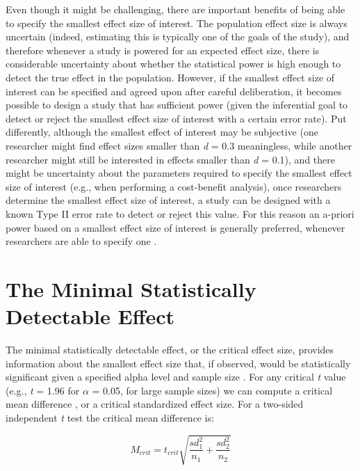 \documentclass[
  oneside]{krantz}
\begin{document}
Even though it might be challenging, there are important benefits of being able to specify the smallest effect size of interest. The population effect size is always uncertain (indeed, estimating this is typically one of the goals of the study), and therefore whenever a study is powered for an expected effect size, there is considerable uncertainty about whether the statistical power is high enough to detect the true effect in the population. However, if the smallest effect size of interest can be specified and agreed upon after careful deliberation, it becomes possible to design a study that has sufficient power (given the inferential goal to detect or reject the smallest effect size of interest with a certain error rate). Put differently, although the smallest effect of interest may be subjective (one researcher might find effect sizes smaller than \emph{d} = 0.3 meaningless, while another researcher might still be interested in effects smaller than \emph{d} = 0.1), and there might be uncertainty about the parameters required to specify the smallest effect size of interest (e.g., when performing a cost-benefit analysis), once researchers determine the smallest effect size of interest, a study can be designed with a known Type II error rate to detect or reject this value. For this reason an a-priori power based on a smallest effect size of interest is generally preferred, whenever researchers are able to specify one \citep{brown_errors_1983, aberson_applied_2019, albers_when_2018, cascio_open_1983, dienes_using_2014, lenth_practical_2001}.

\hypertarget{minimaldetectable}{%
\section{The Minimal Statistically Detectable Effect}\label{minimaldetectable}}

The minimal statistically detectable effect, or the critical effect size, provides information about the smallest effect size that, if observed, would be statistically significant given a specified alpha level and sample size \citep{cook_assessing_2014}. For any critical \emph{t} value (e.g., \emph{t} = 1.96 for \(\alpha\) = 0.05, for large sample sizes) we can compute a critical mean difference \citep{phillips_statistical_2001}, or a critical standardized effect size. For a two-sided independent \emph{t} test the critical mean difference is:

\[M_{crit} = t_{crit}{\sqrt{\frac{sd_1^2}{n_1} + \frac{sd_2^2}{n_2}}}\]
\end{document}
